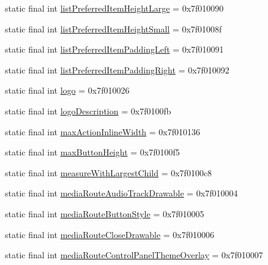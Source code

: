 \begin{CompactItemize}
\item 
static final int \hyperlink{classandroid_1_1support_1_1v7_1_1appcompat_1_1_r_1_1attr_8711a8db45962fa951254b51ea4c5369}{listPreferredItemHeightLarge} = 0x7f010090
\item 
static final int \hyperlink{classandroid_1_1support_1_1v7_1_1appcompat_1_1_r_1_1attr_d76abb39589d97c3d527d2c3859e0b07}{listPreferredItemHeightSmall} = 0x7f01008f
\item 
static final int \hyperlink{classandroid_1_1support_1_1v7_1_1appcompat_1_1_r_1_1attr_0afd4bf47c9df1f2c9d29732faa43d30}{listPreferredItemPaddingLeft} = 0x7f010091
\item 
static final int \hyperlink{classandroid_1_1support_1_1v7_1_1appcompat_1_1_r_1_1attr_027890b071e276962cfa1c0664765411}{listPreferredItemPaddingRight} = 0x7f010092
\item 
static final int \hyperlink{classandroid_1_1support_1_1v7_1_1appcompat_1_1_r_1_1attr_40569bb507b8def39d0a3ff1a7baeb9b}{logo} = 0x7f010026
\item 
static final int \hyperlink{classandroid_1_1support_1_1v7_1_1appcompat_1_1_r_1_1attr_34af6ae6c8a4f86e26a00b98fc71be0a}{logoDescription} = 0x7f0100fb
\item 
static final int \hyperlink{classandroid_1_1support_1_1v7_1_1appcompat_1_1_r_1_1attr_af98f2cffb1ca16e7e91e47c9f914c60}{maxActionInlineWidth} = 0x7f010136
\item 
static final int \hyperlink{classandroid_1_1support_1_1v7_1_1appcompat_1_1_r_1_1attr_57558e1eb5d07c7247dc83cfd0e7b111}{maxButtonHeight} = 0x7f0100f5
\item 
static final int \hyperlink{classandroid_1_1support_1_1v7_1_1appcompat_1_1_r_1_1attr_0b590eeac7d94aac5c991d7c93bb054d}{measureWithLargestChild} = 0x7f0100c8
\item 
static final int \hyperlink{classandroid_1_1support_1_1v7_1_1appcompat_1_1_r_1_1attr_ff916fd5b39893d4a7548aa25eec94d4}{mediaRouteAudioTrackDrawable} = 0x7f010004
\item 
static final int \hyperlink{classandroid_1_1support_1_1v7_1_1appcompat_1_1_r_1_1attr_6d178bfce739f026d801c946a0284e13}{mediaRouteButtonStyle} = 0x7f010005
\item 
static final int \hyperlink{classandroid_1_1support_1_1v7_1_1appcompat_1_1_r_1_1attr_6d0137b769a57b167e5d3050a7522ad0}{mediaRouteCloseDrawable} = 0x7f010006
\item 
static final int \hyperlink{classandroid_1_1support_1_1v7_1_1appcompat_1_1_r_1_1attr_f07c303ea62ecc0789a21b3296c22bbd}{mediaRouteControlPanelThemeOverlay} = 0x7f010007

\end{CompactItemize}
